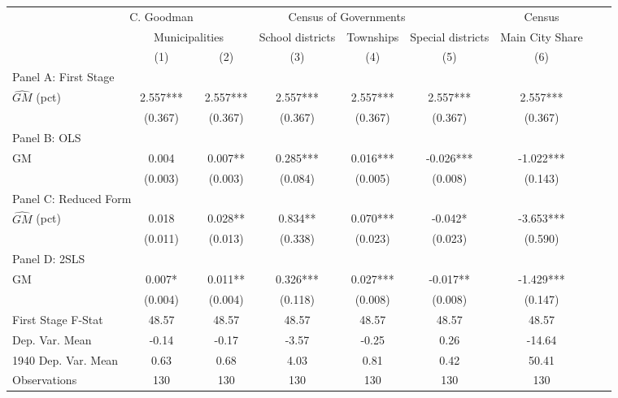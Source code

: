  \begin{tabular}{l*{8}{c}} \toprule
&\multicolumn{1}{c}{C. Goodman}&\multicolumn{4}{c}{Census of Governments}&\multicolumn{1}{c}{Census}\\\cmidrule(lr){2-2}\cmidrule(lr){3-6}\cmidrule(lr){7-7}
&\multicolumn{2}{c}{Municipalities}&\multicolumn{1}{c}{School districts}&\multicolumn{1}{c}{Townships}&\multicolumn{1}{c}{Special districts}&\multicolumn{1}{c}{Main City Share}\\\cmidrule(lr){2-3}\cmidrule(lr){4-6}\cmidrule(lr){7-7}
&\multicolumn{1}{c}{(1)}&\multicolumn{1}{c}{(2)}&\multicolumn{1}{c}{(3)}&\multicolumn{1}{c}{(4)}&\multicolumn{1}{c}{(5)}&\multicolumn{1}{c}{(6)}\\
\cmidrule(lr){1-7}
\multicolumn{6}{l}{Panel A: First Stage}\\
\cmidrule(lr){1-7}
$\widehat{GM}$ (pct)&    2.557***&    2.557***&    2.557***&    2.557***&    2.557***&    2.557***\\
                &  (0.367)   &  (0.367)   &  (0.367)   &  (0.367)   &  (0.367)   &  (0.367)   \\
\cmidrule(lr){1-7}
\multicolumn{6}{l}{Panel B: OLS}\\
\cmidrule(lr){1-7}
GM              &    0.004   &    0.007** &    0.285***&    0.016***&   -0.026***&   -1.022***\\
                &  (0.003)   &  (0.003)   &  (0.084)   &  (0.005)   &  (0.008)   &  (0.143)   \\
\cmidrule(lr){1-7}
\multicolumn{6}{l}{Panel C: Reduced Form}\\
\cmidrule(lr){1-7}
$\widehat{GM}$ (pct)&    0.018   &    0.028** &    0.834** &    0.070***&   -0.042*  &   -3.653***\\
                &  (0.011)   &  (0.013)   &  (0.338)   &  (0.023)   &  (0.023)   &  (0.590)   \\
\cmidrule(lr){1-7}
\multicolumn{6}{l}{Panel D: 2SLS}\\
\cmidrule(lr){1-7}
GM              &    0.007*  &    0.011** &    0.326***&    0.027***&   -0.017** &   -1.429***\\
                &  (0.004)   &  (0.004)   &  (0.118)   &  (0.008)   &  (0.008)   &  (0.147)   \\
\midrule
First Stage F-Stat&    48.57   &    48.57   &    48.57   &    48.57   &    48.57   &    48.57   \\
Dep. Var. Mean  &    -0.14   &    -0.17   &    -3.57   &    -0.25   &     0.26   &   -14.64   \\
1940 Dep. Var. Mean&     0.63   &     0.68   &     4.03   &     0.81   &     0.42   &    50.41   \\
Observations    &      130   &      130   &      130   &      130   &      130   &      130   \\
 \bottomrule \end{tabular}
